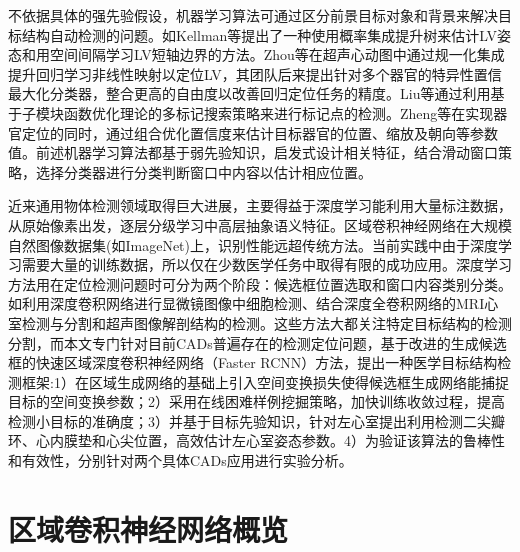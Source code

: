不依据具体的强先验假设，机器学习算法可通过区分前景目标对象和背景来解决目标结构自动检测的问题。如Kellman等\citep{Lu2011}提出了一种使用概率集成提升树来估计LV姿态和用空间间隔学习LV短轴边界的方法。Zhou等\citep{Zhou2005}在超声心动图中通过规一化集成提升回归学习非线性映射以定位LV，其团队后来提出针对多个器官的特异性置信最大化分类器，整合更高的自由度以改善回归定位任务的精度。Liu等\citep{She2007}通过利用基于子模块函数优化理论的多标记搜索策略来进行标记点的检测。Zheng等\citep{Zheng2014}在实现器官定位的同时，通过组合优化置信度来估计目标器官的位置、缩放及朝向等参数值。前述机器学习算法都基于弱先验知识，启发式设计相关特征，结合滑动窗口策略，选择分类器进行分类判断窗口中内容以估计相应位置。


近来通用物体检测领域取得巨大进展，主要得益于深度学习能利用大量标注数据，从原始像素出发，逐层分级学习中高层抽象语义特征\citep{Sharif2014}。区域卷积神经网络\citep{Girshick2014b}在大规模自然图像数据集(如ImageNet\citep{Russakovsky})上，识别性能远超传统方法\citep{Girshick2014b,Krizhevsky2012}。当前实践中由于深度学习需要大量的训练数据，所以仅在少数医学任务中取得有限的成功应用。深度学习方法用在定位检测问题时可分为两个阶段\citep{Girshick2015b}：候选框位置选取和窗口内容类别分类。如利用深度卷积网络进行显微镜图像中细胞检测\citep{Akram2016}、结合深度全卷积网络的MRI心室检测与分割\citep{Emad2015,Tran2016a}和超声图像解剖结构的检测\citep{Chen2016i}。这些方法大都关注特定目标结构的检测分割，而本文专门针对目前CADs普遍存在的检测定位问题，基于改进的生成候选框的快速区域深度卷积神经网络（Faster RCNN）\citep{Ren2015a}方法，提出一种医学目标结构检测框架:1）在区域生成网络的基础上引入空间变换损失使得候选框生成网络能捕捉目标的空间变换参数；2）采用在线困难样例挖掘策略，加快训练收敛过程，提高检测小目标的准确度；3）并基于目标先验知识，针对左心室提出利用检测二尖瓣环、心内膜垫和心尖位置，高效估计左心室姿态参数。4）为验证该算法的鲁棒性和有效性，分别针对两个具体CADs应用进行实验分析。

\section{区域卷积神经网络概览}
 
